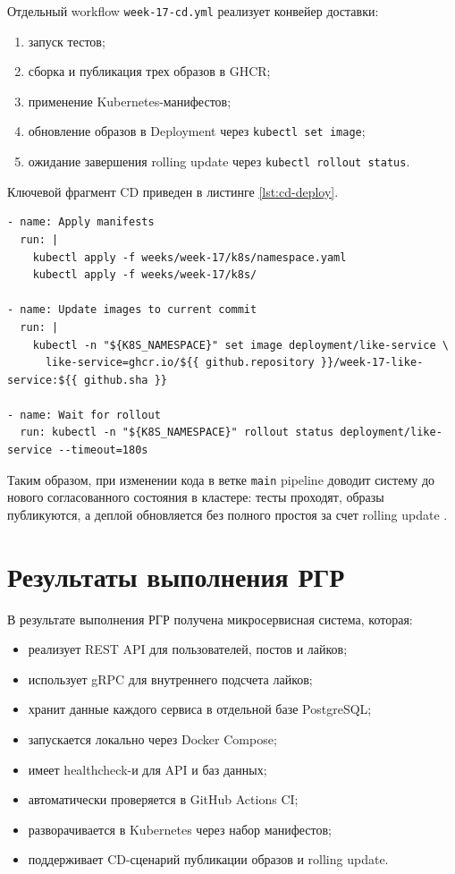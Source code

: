 Отдельный workflow \texttt{week-17-cd.yml} реализует конвейер доставки:
\begin{enumerate}
    \item запуск тестов;
    \item сборка и публикация трех образов в GHCR;
    \item применение Kubernetes-манифестов;
    \item обновление образов в Deployment через \texttt{kubectl set image};
    \item ожидание завершения rolling update через \texttt{kubectl rollout status}.
\end{enumerate}

Ключевой фрагмент CD приведен в листинге \ref{lst:cd-deploy}.

\begin{lstlisting}[caption={Шаги deploy в GitHub Actions CD}, label={lst:cd-deploy}]
- name: Apply manifests
  run: |
    kubectl apply -f weeks/week-17/k8s/namespace.yaml
    kubectl apply -f weeks/week-17/k8s/

- name: Update images to current commit
  run: |
    kubectl -n "${K8S_NAMESPACE}" set image deployment/like-service \
      like-service=ghcr.io/${{ github.repository }}/week-17-like-service:${{ github.sha }}

- name: Wait for rollout
  run: kubectl -n "${K8S_NAMESPACE}" rollout status deployment/like-service --timeout=180s
\end{lstlisting}

Таким образом, при изменении кода в ветке \texttt{main} pipeline доводит систему до нового
согласованного состояния в кластере: тесты проходят, образы публикуются, а деплой обновляется без
полного простоя за счет rolling update \cite{github_actions_docs,kubectl_docs}.

\section{Результаты выполнения РГР}

В результате выполнения РГР получена микросервисная система, которая:
\begin{itemize}
    \item реализует REST API для пользователей, постов и лайков;
    \item использует gRPC для внутреннего подсчета лайков;
    \item хранит данные каждого сервиса в отдельной базе PostgreSQL;
    \item запускается локально через Docker Compose;
    \item имеет healthcheck-и для API и баз данных;
    \item автоматически проверяется в GitHub Actions CI;
    \item разворачивается в Kubernetes через набор манифестов;
    \item поддерживает CD-сценарий публикации образов и rolling update.
\end{itemize}


